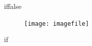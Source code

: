 iffalse
\begin{frame}
	\begin{block}{}
		\begin{compactitem}
			\item 
		\end{compactitem}
	\end{block}
\end{frame}
\begin{frame}
	\begin{block}{}
		\begin{compactitem}
			\item 
			\begin{figure}[htbp]
				\centering
				\texttt{[image: imagefile]}
			\end{figure}
		\end{compactitem}
	\end{block}
\end{frame}
if